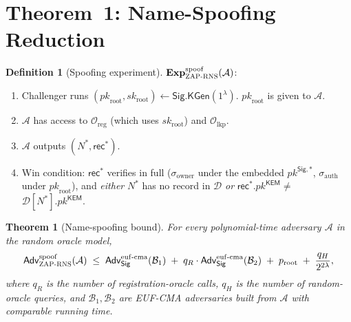 \documentclass[11pt,a4paper]{article}
\newtheorem{theorem}{Theorem}
\theoremstyle{definition}
\newtheorem{definition}{Definition}
\theoremstyle{remark}
\newcommand{\rec}{\mathsf{rec}}
\newcommand{\KEM}{\mathsf{KEM}}
\newcommand{\Sig}{\mathsf{Sig}}
\newcommand{\Adv}{\mathsf{Adv}}
\newcommand{\KGen}{\mathsf{KGen}}
\newcommand{\pk}{\mathit{pk}}
\newcommand{\sk}{\mathit{sk}}
\newcommand{\RNS}{\textsc{ZAP-RNS}}
\begin{document}
\section{Theorem~1: Name-Spoofing Reduction}

\begin{definition}[Spoofing experiment]
$\mathbf{Exp}^{\mathrm{spoof}}_{\RNS}(\mathcal{A})$:
\begin{enumerate}[leftmargin=*,label=\arabic*.]
\item Challenger runs $(\pk_{\mathrm{root}}, \sk_{\mathrm{root}}) \gets
\Sig.\KGen(1^\lambda)$. $\pk_{\mathrm{root}}$ is given to $\mathcal{A}$.
\item $\mathcal{A}$ has access to $\mathcal{O}_{\mathrm{reg}}$ (which uses
$\sk_{\mathrm{root}}$) and $\mathcal{O}_{\mathrm{lkp}}$.
\item $\mathcal{A}$ outputs $(N^*, \rec^*)$.
\item Win condition: $\rec^*$ verifies in full ($\sigma_{\mathrm{owner}}$
under the embedded $\pk^{\Sig,*}$, $\sigma_{\mathrm{auth}}$ under
$\pk_{\mathrm{root}}$), and \emph{either} $N^*$ has no record in
$\mathcal{D}$ \emph{or} $\rec^*$.$\pk^\KEM \ne$
$\mathcal{D}[N^*].\pk^\KEM$.
\end{enumerate}
\end{definition}

\begin{theorem}[Name-spoofing bound]\label{thm:spoof}
For every polynomial-time adversary $\mathcal{A}$ in the random oracle
model,
\[
\Adv^{\mathrm{spoof}}_{\RNS}(\mathcal{A}) \;\le\;
\Adv^{\mathrm{euf\text{-}cma}}_{\Sig}(\mathcal{B}_1) \;+\;
q_R \cdot \Adv^{\mathrm{euf\text{-}cma}}_{\Sig}(\mathcal{B}_2) \;+\;
p_{\mathrm{root}} \;+\; \frac{q_H}{2^{2\lambda}},
\]
where $q_R$ is the number of registration-oracle calls, $q_H$ is the
number of random-oracle queries, and $\mathcal{B}_1, \mathcal{B}_2$ are
EUF-CMA adversaries built from $\mathcal{A}$ with comparable running
time.
\end{theorem}
\end{document}
